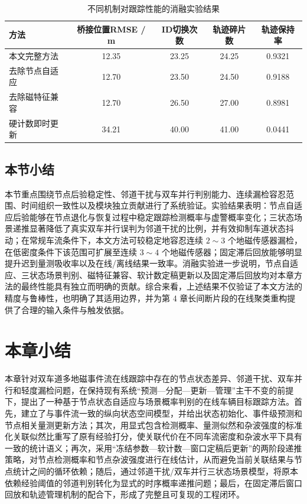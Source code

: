 \documentclass{xdupgthesis}
\begin{document}
\begin{table}[htbp]
	\centering
	\caption{不同机制对跟踪性能的消融实验结果}
	\label{tab:ablation_tracking}
	\begin{tabular}{lcccc}
		\toprule
		方法 & 桥接位置RMSE / m & ID切换次数 & 轨迹碎片数 & 轨迹保持率 \\
		\midrule
		本文完整方法      & 12.35 & 23.25 & 24.25 & 0.9321 \\
		去除节点自适应    & 12.70 & 23.50 & 24.50 & 0.9188 \\
		去除磁特征兼容    & 12.70 & 26.50 & 27.00 & 0.8981 \\
		硬计数即时更新    & 34.21 & 40.00 & 41.00 & 0.0441 \\
		\bottomrule
	\end{tabular}
\end{table}


\subsection{本节小结}

本节重点围绕节点后验稳定性、邻道干扰与双车并行判别能力、连续漏检容忍范围、时间组织一致性以及模块独立贡献进行了系统验证。实验结果表明：节点自适应后验能够在节点退化与恢复过程中稳定跟踪检测概率与虚警概率变化；三状态场景递推显著降低了真实双车并行误判为邻道干扰的比例，并有效抑制车道状态抖动；在常规车流条件下，本文方法可较稳定地容忍连续 $2\sim3$ 个地磁传感器漏检，在低密度条件下该范围可扩展至连续 $3\sim4$ 个地磁传感器；固定滞后回放能够明显提升迟到量测吸收率以及在线/离线结果一致率。消融实验进一步说明，节点自适应、三状态场景判别、磁特征兼容、软计数定稿更新以及固定滞后回放均对本章方法的最终性能具有独立而明确的贡献。综合来看，上述结果不仅验证了本文方法的精度与鲁棒性，也明确了其适用边界，并为第 4 章长间断片段的在线聚类重构提供了合理的输入条件与触发依据。


\section{本章小结}

本章针对双车道多地磁事件流在线跟踪中存在的节点状态差异、邻道干扰、双车并行和轻度漏检问题，在保持现有系统“预测—分配—更新—管理”主干不变的前提下，提出了一种基于节点状态自适应与场景概率判别的在线车辆目标跟踪方法。首先，建立了与事件流一致的纵向状态空间模型，并给出状态初始化、事件级预测和节点相关量测更新方法；其次，用显式包含检测概率、量测似然和杂波强度的标准化关联似然比重写了原有经验打分，使关联代价在不同车流密度和杂波水平下具有一致的统计语义；再次，采用“冻结参数—软计数—窗口定稿后更新”的两阶段递推策略，对节点检测概率和节点杂波强度进行在线估计，从而避免当前关联结果与节点统计之间的循环依赖；随后，通过邻道干扰/双车并行三状态场景模型，将原本依赖经验阈值的邻道判别转化为显式的时序概率递推问题；最后，在固定滞后窗口回放和轨迹管理机制的配合下，形成了完整且可复现的工程闭环。
\end{document}
